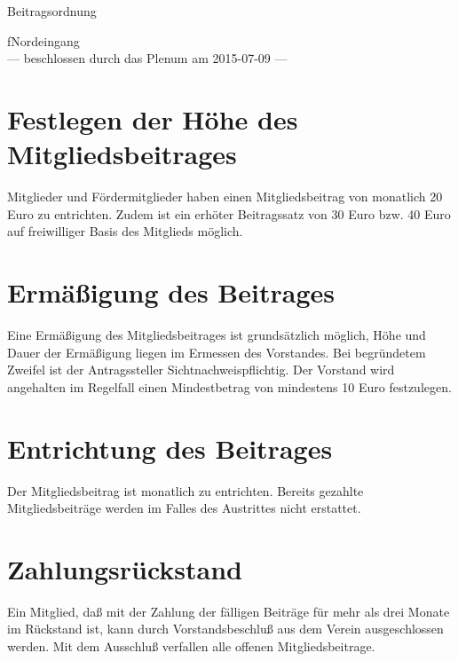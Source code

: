 \documentclass[ngerman]{scrartcl}
\begin{document}
\renewcommand*{\othersectionlevelsformat}[3]{\S#3\autodot\enskip}
\begin{titlepage}
\centerline{\Large Beitragsordnung}
\begin{center}
{\Huge fNordeingang}\\[5mm]
\vfill
--- beschlossen durch das Plenum am 2015-07-09 ---
\end{center}
\end{titlepage}
\section{Festlegen der Höhe des Mitgliedsbeitrages}
Mitglieder und Fördermitglieder haben einen Mitgliedsbeitrag von monatlich
20 Euro zu entrichten. Zudem ist ein erhöter Beitragssatz von 30 Euro bzw. 40 Euro auf freiwilliger Basis des Mitglieds möglich.
\section{Ermäßigung des Beitrages}
Eine Ermäßigung des Mitgliedsbeitrages ist grundsätzlich möglich, Höhe und
Dauer der Ermäßigung liegen im Ermessen des Vorstandes. Bei begründetem
Zweifel ist der Antragssteller Sichtnachweispflichtig. Der Vorstand wird angehalten im Regelfall einen Mindestbetrag von mindestens 10 Euro festzulegen.
\section{Entrichtung des Beitrages}
Der Mitgliedsbeitrag ist monatlich zu entrichten.
Bereits gezahlte Mitgliedsbeiträge werden im Falles
des Austrittes nicht erstattet.
\section{Zahlungsrückstand}
Ein Mitglied, daß mit der Zahlung der fälligen Beiträge für mehr als drei
Monate im Rückstand ist, kann durch Vorstandsbeschluß aus dem Verein
ausgeschlossen werden. Mit dem Ausschluß verfallen alle offenen Mitgliedsbeitrage.
\end{document}
